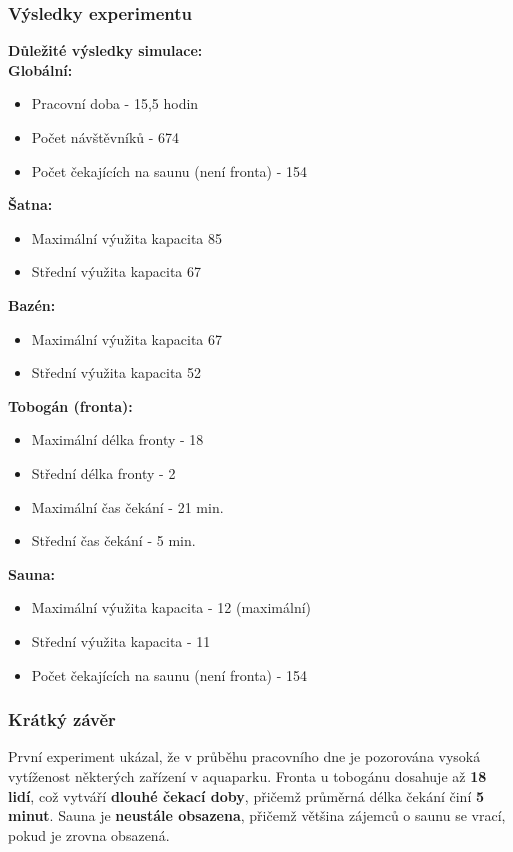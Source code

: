 \documentclass[a4paper, 11pt]{article}
\begin{document}
    \subsubsection{Výsledky experimentu}
    \textbf{Důležité výsledky simulace:}\\
    \textbf{Globální:}
    \begin{itemize}
    \item Pracovní doba - 15,5 hodin
    \item Počet návštěvníků - 674
    \item Počet čekajících na saunu (není fronta) - 154
    \end{itemize}
    \textbf{Šatna:}
    \begin{itemize}
    \item Maximální výužita kapacita 85
    \item Střední výužita kapacita 67
    \end{itemize}
    \textbf{Bazén:}
    \begin{itemize}
    \item Maximální výužita kapacita 67
    \item Střední výužita kapacita 52
    \end{itemize}
    \textbf{Tobogán (fronta):}
    \begin{itemize}
    \item Maximální délka fronty - 18
    \item Střední délka fronty - 2
    \item Maximální čas čekání - 21 min.
    \item Střední čas čekání - 5 min.
    \end{itemize}
    \textbf{Sauna:}
    \begin{itemize}
    \item Maximální výužita kapacita - 12 (maximální)
    \item Střední výužita kapacita - 11
    \item Počet čekajících na saunu (není fronta) - 154
    \end{itemize}
    \subsubsection{Krátký závěr}
    První experiment ukázal, že v průběhu pracovního dne je pozorována vysoká vytíženost některých zařízení v aquaparku. Fronta u tobogánu dosahuje až \textbf{18 lidí}, což vytváří \textbf{dlouhé čekací doby}, přičemž průměrná délka čekání činí \textbf{5 minut}. Sauna je \textbf{neustále obsazena}, přičemž většina zájemců o saunu se vrací, pokud je zrovna obsazená.
    \clearpage
\end{document}
